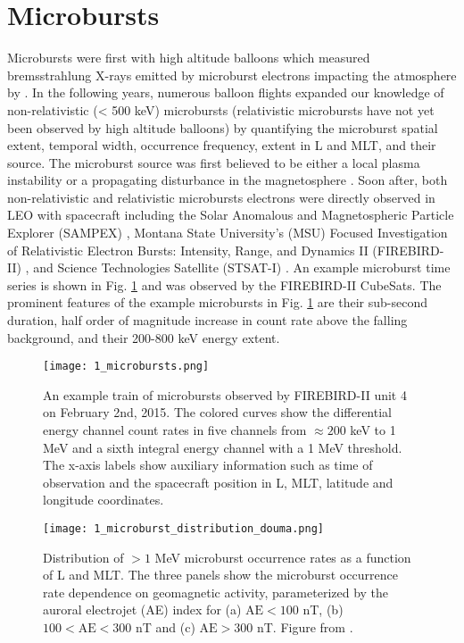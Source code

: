 \section{Microbursts}\label{Intro:microbursts}
Microbursts were first with high altitude balloons which measured bremsstrahlung X-rays emitted by microburst electrons impacting the atmosphere by \citet{Anderson1964}. In the following years, numerous balloon flights expanded our knowledge of non-relativistic (< 500 keV) microbursts (relativistic microbursts have not yet been observed by high altitude balloons) by quantifying the microburst spatial extent, temporal width, occurrence frequency, extent in L and MLT, and their source. The microburst source was first believed to be either a local plasma instability or a propagating disturbance in the magnetosphere \citep{Trefall1966, Brown1965_2, Barcus1966, Parks1967}. Soon after, both non-relativistic and relativistic microbursts electrons were directly observed in LEO with spacecraft including the Solar Anomalous and Magnetospheric Particle Explorer (SAMPEX) \citep[e.g.][]{Blake1996, Blum2015, Lorentzen2001a, Lorentzen2001b, Nakamura1995, Nakamura2000, O'Brien2003, O'Brien2004, Greeley2019, Douma2017, Douma2019},  Montana State University's (MSU) Focused Investigation of Relativistic Electron Bursts: Intensity, Range, and Dynamics II (FIREBIRD-II) \citep{Spence2012, Klumpar2015, Crew2016, Anderson2017, Breneman2017}, and Science Technologies Satellite (STSAT-I) \citep[e.g.][]{Lee2005, Lee2012}. An example microburst time series is shown in Fig. \ref{Intro:microbursts} and was observed by the FIREBIRD-II CubeSats. The prominent features of the example microbursts in Fig. \ref{Intro:microbursts} are their sub-second duration, half order of magnitude increase in count rate above the falling background, and their 200-800 keV energy extent.

\begin{figure}
\texttt{[image: 1\_microbursts.png]}
\caption{An example train of microbursts observed by FIREBIRD-II unit 4 on February 2nd, 2015. The colored curves show the differential energy channel count rates in five channels from $\approx 200$ keV to 1 MeV and a sixth integral energy channel with a 1 MeV threshold. The x-axis labels show auxiliary information such as time of observation and the spacecraft position in L, MLT, latitude and longitude coordinates.}
\label{Intro:microbursts}
\end{figure}

\begin{figure}
\texttt{[image: 1\_microburst\_distribution\_douma.png]}
\caption{Distribution of $> 1$ MeV microburst occurrence rates as a function of L and MLT. The three panels show the microburst occurrence rate dependence on geomagnetic activity, parameterized by the auroral electrojet (AE) index for (a) $\mathrm{AE} < 100$ nT, (b) $100 < \mathrm{AE} < 300$ nT and (c) $\mathrm{AE} > 300$ nT. Figure from \citet{Douma2017}.}
\label{Intro:microburst_distribution}
\end{figure}


